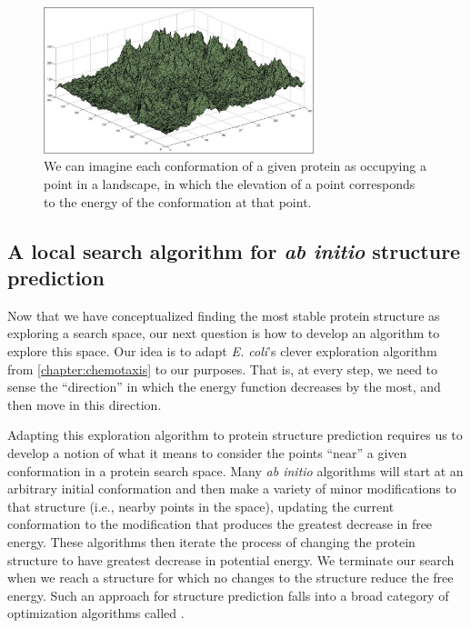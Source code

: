 \begin{figure}[h]
	\centering
	\mySfFamily
	\includegraphics[width = 0.7\textwidth]{../images/energy_landscape.png}
	\caption{We can imagine each conformation of a given protein as occupying a point in a landscape, in which the elevation of a point corresponds to the energy of the conformation at that point.}
	\label{fig:energy_landscape}
\end{figure}

\FloatBarrier
{}
\subsection{A local search algorithm for \textit{ab initio} structure prediction}

Now that we have conceptualized finding the most stable protein structure as exploring a search space, our next question is how to develop an algorithm to explore this space. Our idea is to adapt \textit{E. coli}'s clever exploration algorithm from \autoref{chapter:chemotaxis} to our purposes. That is, at every step, we need to sense the ``direction'' in which the energy function decreases by the most, and then move in this direction.

Adapting this exploration algorithm to protein structure prediction requires us to develop a notion of what it means to consider the points ``near'' a given conformation in a protein search space. Many \textit{ab initio} algorithms will start at an arbitrary initial conformation and then make a variety of minor modifications to that structure (i.e., nearby points in the space), updating the current conformation to the modification that produces the greatest decrease in free energy. These algorithms then iterate the process of changing the protein structure to have greatest decrease in potential energy. We terminate our search when we reach a structure for which no changes to the structure reduce the free energy. Such an approach for structure prediction falls into a broad category of optimization algorithms called .

